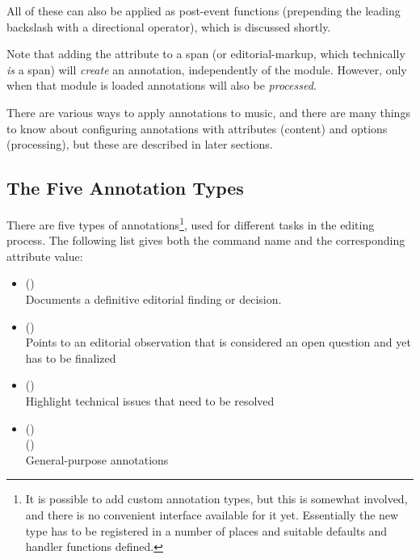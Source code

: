 \documentclass[]{ollmanual}
\providecommand{\tightlist}{%
  \setlength{\itemsep}{0pt}\setlength{\parskip}{0pt}}
\begin{document}
All of these can also be applied as post-event functions (prepending the
leading backslash with a directional operator), which is discussed
shortly.

Note that adding the  attribute to a span (or
editorial-markup, which technically \emph{is} a span) will \emph{create}
an annotation, independently of the  module.
However, only when that module is loaded annotations will also be
\emph{processed}.

There are various ways to apply annotations to music, and there are many
things to know about configuring annotations with attributes (content)
and options (processing), but these are described in later sections.

\hypertarget{the-five-annotation-types}{%
\subsection{The Five Annotation Types}\label{the-five-annotation-types}}

There are five types of annotations\footnote{It is possible to add
  custom annotation types, but this is somewhat involved, and there is
  no convenient interface available for it yet. Essentially the new type
  has to be registered in a number of places and suitable defaults and
  handler functions defined.}, used for different tasks in the editing
process. The following list gives both the command name and the
corresponding  attribute value:

\begin{itemize}
\tightlist
\item
   ()\\
  Documents a definitive editorial finding or decision.
\item
   ()\\
  Points to an editorial observation that is considered an open question
  and yet has to be finalized
\item
   ()\\
  Highlight technical issues that need to be resolved
\item
   ()\\
   ()\\
  General-purpose annotations
\end{itemize}
\end{document}
